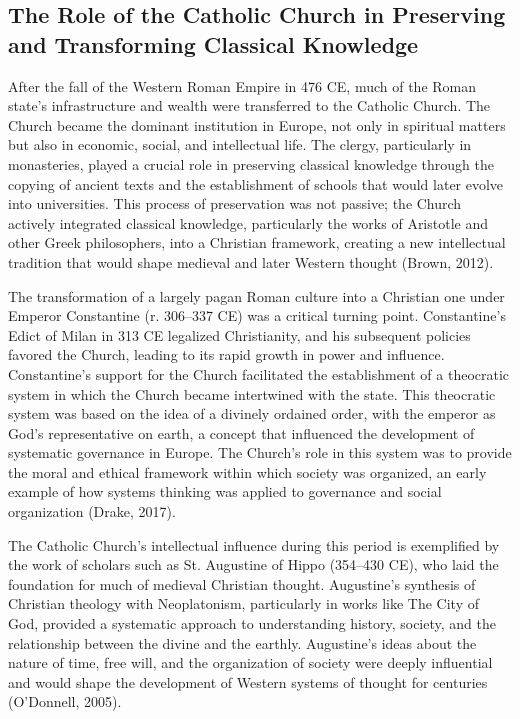 \documentclass[twocolumn]{article}
\begin{document}
\subsection{The Role of the Catholic Church in Preserving and Transforming Classical Knowledge}

\textcolor{primary}{After the fall of the Western Roman Empire in 476 CE, much of the Roman state's infrastructure and wealth were transferred to the Catholic Church. The Church became the dominant institution in Europe, not only in spiritual matters but also in economic, social, and intellectual life. The clergy, particularly in monasteries, played a crucial role in preserving classical knowledge through the copying of ancient texts and the establishment of schools that would later evolve into universities. This process of preservation was not passive; the Church actively integrated classical knowledge, particularly the works of Aristotle and other Greek philosophers, into a Christian framework, creating a new intellectual tradition that would shape medieval and later Western thought (Brown, 2012).}

\textcolor{secondary}{The transformation of a largely pagan Roman culture into a Christian one under Emperor Constantine (r. 306–337 CE) was a critical turning point. Constantine's Edict of Milan in 313 CE legalized Christianity, and his subsequent policies favored the Church, leading to its rapid growth in power and influence. Constantine's support for the Church facilitated the establishment of a theocratic system in which the Church became intertwined with the state. This theocratic system was based on the idea of a divinely ordained order, with the emperor as God's representative on earth, a concept that influenced the development of systematic governance in Europe. The Church's role in this system was to provide the moral and ethical framework within which society was organized, an early example of how systems thinking was applied to governance and social organization (Drake, 2017).}

\textcolor{primary}{The Catholic Church's intellectual influence during this period is exemplified by the work of scholars such as St. Augustine of Hippo (354–430 CE), who laid the foundation for much of medieval Christian thought. Augustine's synthesis of Christian theology with Neoplatonism, particularly in works like The City of God, provided a systematic approach to understanding history, society, and the relationship between the divine and the earthly. Augustine's ideas about the nature of time, free will, and the organization of society were deeply influential and would shape the development of Western systems of thought for centuries (O'Donnell, 2005).}
\end{document}
